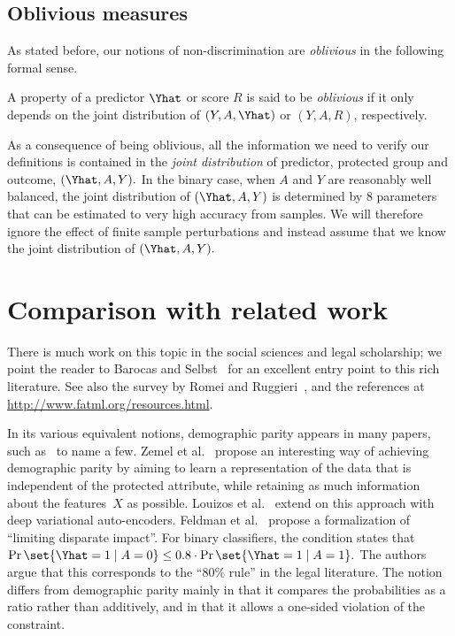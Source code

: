 \subsection{Oblivious measures}
As stated before, our notions of non-discrimination are \emph{oblivious} 
in the following formal sense.
%
\begin{definition}
  A property of a predictor $\Yhat$ or score $R$ is said to be
  \emph{oblivious} if it only depends on the joint distribution of
  $(Y,A,\Yhat)$ or $(Y,A,R)$, respectively.
\end{definition}
%
As a consequence of being oblivious, all the information we need to verify our
definitions is contained in the \emph{joint distribution} of predictor,
protected group and outcome, $(\Yhat, A, Y).$ In the binary case, when $A$ and
$Y$ are reasonably well balanced, the joint distribution of $(\Yhat, A, Y)$ is
determined by $8$ parameters that can be estimated to very high accuracy from
samples. We will therefore ignore the effect of finite sample perturbations and
instead assume that we know the joint distribution of $(\Yhat, A, Y).$


\section{Comparison with related work}

There is much work on this topic in the social sciences and legal scholarship;
we point the reader to Barocas and Selbst~\cite{BarocasS16} for an excellent
entry point to this rich literature. See also the survey by Romei and
Ruggieri~\cite{RomeiR14}, and the references at
\url{http://www.fatml.org/resources.html}.

In its various equivalent notions, demographic parity
appears in many papers, such
as~\cite{CaldersKP09,Zliobaite15,Zafar15} to name a few.
%
Zemel et al.~\cite{ZemelWSPD13} propose an interesting way of achieving
demographic parity by aiming to learn a representation of the data that is
independent of the protected attribute, while retaining as much information
about the features~$X$ as possible. Louizos et al.~\cite{LouizosSLWZ15} extend
on this approach with deep variational auto-encoders.
%
Feldman et al.~\cite{FeldmanFMSV15} propose a formalization of ``limiting
disparate impact''. For binary classifiers, the condition states that
$\Pr\set{ \Yhat = 1 \mid A = 0} \le 0.8\cdot \Pr\set{\Yhat = 1 \mid A = 1}.$
The authors argue that this corresponds to the ``80\% rule'' in the legal
literature.  The notion differs from demographic parity mainly in that it
compares the probabilities as a ratio rather than additively, and in that it
allows a one-sided violation of the constraint.

